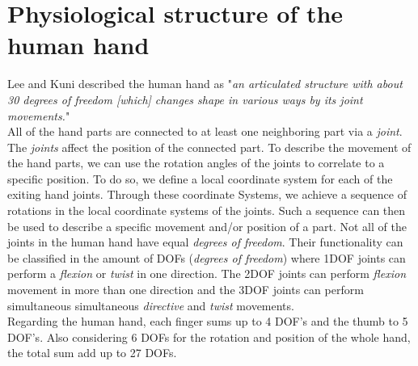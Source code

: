 \section{Physiological structure of the human hand}
\label{sec:Physiological_structure_of_the_human_hand}
Lee and Kuni \cite{LEE.1995} described the human hand as "\textit{an articulated structure with about 30 degrees of freedom [which] changes shape in various ways by its joint movements.}"\\
All of the hand parts are connected to at least one neighboring part via a \textit{joint}. The \textit{joints} affect the position of the connected part. To describe the movement of the hand parts, we can use the rotation angles of the joints to correlate to a specific position.
To do so, we define a local coordinate system for each of the exiting hand joints. Through these coordinate Systems, we achieve a sequence of rotations in the local coordinate systems of the joints. Such a sequence can then be used to describe a specific movement and/or position of a part.
Not all of the joints in the human hand have equal \textit{degrees of freedom}. Their functionality can be classified in the amount of DOFs (\textit{degrees of freedom})\cite{KOREIN.1985} where 1DOF joints can perform a \textit{flexion} or \textit{twist} in one direction. The 2DOF joints can perform \textit{flexion} movement in more than one direction and the 3DOF joints can perform simultaneous simultaneous \textit{directive} and \textit{twist} movements.\\
Regarding the human hand, each finger sums up to 4 DOF's and the thumb to 5 DOF's. Also considering 6 DOFs for the rotation and position of the whole hand, the total sum add up to 27 DOFs.
